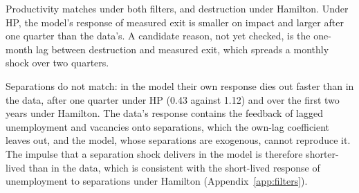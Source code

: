 \documentclass[authoryear, review, 12pt]{elsarticle}
\begin{document}
Productivity matches under both filters, and destruction under Hamilton. Under HP, the model's response of measured exit is smaller on impact and larger after one quarter than the data's. A candidate reason, not yet checked, is the one-month lag between destruction and measured exit, which spreads a monthly shock over two quarters.

Separations do not match: in the model their own response dies out faster than in the data, after one quarter under HP (0.43 against 1.12) and over the first two years under Hamilton. The data's response contains the feedback of lagged unemployment and vacancies onto separations, which the own-lag coefficient leaves out, and the model, whose separations are exogenous, cannot reproduce it. The impulse that a separation shock delivers in the model is therefore shorter-lived than in the data, which is consistent with the short-lived response of unemployment to separations under Hamilton (Appendix~\ref{app:filters}).
\end{document}
